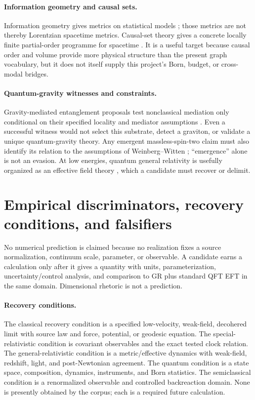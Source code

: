 \documentclass[11pt,a4paper]{article}
\theoremstyle{remark}
\begin{document}
\paragraph{Information geometry and causal sets.} Information geometry gives
metrics on statistical models \citep{amari2016}; those metrics are not thereby
Lorentzian spacetime metrics. Causal-set theory gives a concrete locally finite
partial-order programme for spacetime \citep{bombelli1987,surya2019}. It is a
useful target because causal order and volume provide more physical structure
than the present graph vocabulary, but it does not itself supply this project's
Born, budget, or cross-modal bridges.

\paragraph{Quantum-gravity witnesses and constraints.} Gravity-mediated
entanglement proposals test nonclassical mediation only conditional on their
specified locality and mediator assumptions \citep{bose2017,belenchia2018}.
Even a successful witness would not select this substrate, detect a graviton, or
validate a unique quantum-gravity theory. Any emergent massless-spin-two claim
must also identify its relation to the assumptions of Weinberg--Witten
\citep{weinberg1980}; ``emergence'' alone is not an evasion. At low energies,
quantum general relativity is usefully organized as an effective field theory
\citep{donoghue1994}, which a candidate must recover or delimit.

\section{Empirical discriminators, recovery conditions, and falsifiers}\label{sec:falsifiers}
No numerical prediction is claimed because no realization fixes a source
normalization, continuum scale, parameter, or observable. A candidate earns a
calculation only after it gives a quantity with units, parameterization,
uncertainty/control analysis, and comparison to GR plus standard QFT EFT in the
same domain. Dimensional rhetoric is not a prediction.

\paragraph{Recovery conditions.} The classical recovery condition is a specified
low-velocity, weak-field, decohered limit with source law and force, potential,
or geodesic equation. The special-relativistic condition is covariant
observables and the exact tested clock relation. The general-relativistic
condition is a metric/effective dynamics with weak-field, redshift, light, and
post-Newtonian agreement. The quantum condition is a state space, composition,
dynamics, instruments, and Born statistics. The semiclassical condition is a
renormalized observable and controlled backreaction domain. None is presently
obtained by the corpus; each is a required future calculation.
\end{document}
